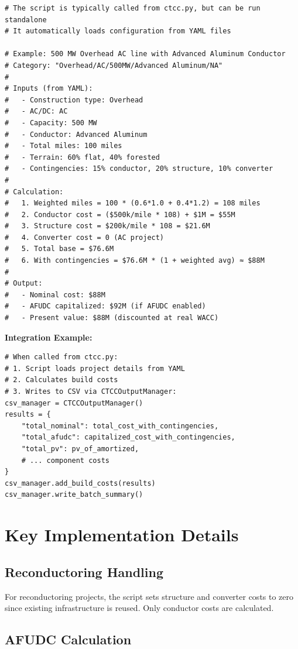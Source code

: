\documentclass[12pt]{article}
\begin{document}
\begin{lstlisting}
# The script is typically called from ctcc.py, but can be run standalone
# It automatically loads configuration from YAML files

# Example: 500 MW Overhead AC line with Advanced Aluminum Conductor
# Category: "Overhead/AC/500MW/Advanced Aluminum/NA"
# 
# Inputs (from YAML):
#   - Construction type: Overhead
#   - AC/DC: AC
#   - Capacity: 500 MW
#   - Conductor: Advanced Aluminum
#   - Total miles: 100 miles
#   - Terrain: 60% flat, 40% forested
#   - Contingencies: 15% conductor, 20% structure, 10% converter
#
# Calculation:
#   1. Weighted miles = 100 * (0.6*1.0 + 0.4*1.2) = 108 miles
#   2. Conductor cost = ($500k/mile * 108) + $1M = $55M
#   3. Structure cost = $200k/mile * 108 = $21.6M
#   4. Converter cost = 0 (AC project)
#   5. Total base = $76.6M
#   6. With contingencies = $76.6M * (1 + weighted avg) ≈ $88M
#
# Output:
#   - Nominal cost: $88M
#   - AFUDC capitalized: $92M (if AFUDC enabled)
#   - Present value: $88M (discounted at real WACC)
\end{lstlisting}

\textbf{Integration Example:}

\begin{lstlisting}
# When called from ctcc.py:
# 1. Script loads project details from YAML
# 2. Calculates build costs
# 3. Writes to CSV via CTCCOutputManager:
csv_manager = CTCCOutputManager()
results = {
    "total_nominal": total_cost_with_contingencies,
    "total_afudc": capitalized_cost_with_contingencies,
    "total_pv": pv_of_amortized,
    # ... component costs
}
csv_manager.add_build_costs(results)
csv_manager.write_batch_summary()
\end{lstlisting}

\section{Key Implementation Details}

\subsection{Reconductoring Handling}

For reconductoring projects, the script sets structure and converter costs to zero since existing infrastructure is reused. Only conductor costs are calculated.

\subsection{AFUDC Calculation}
\end{document}
